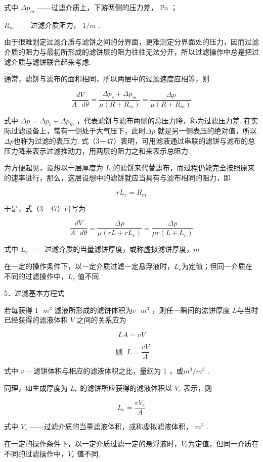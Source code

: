 \documentclass[
]{article}
\begin{document}
式中 \(\Delta p_{m}\) ------过滤介质上，下游两侧的压力差， Pa ；

\(R_{m}\) ------过滤介质阻力， \(1/m\) . 

由于很难划定过滤介质与滤饼之间的分界面，更难测定分界面处的压力，因而过滤介质的阻力与最初所形成的滤饼层的阻力往往无法分开，所以过滤操作中总是把过滤介质与滤饼联合起来考虑. 

通常，滤饼与滤布的面积相同，所以两层中的过滤速度应相等，则

\[\frac{dV}{A\text{\ }d\theta} = \frac{\Delta p_{c} + \Delta p_{m}}{\mu\left( R + R_{m} \right)} = \frac{\Delta p}{\mu\left( R + R_{m} \right)}\]

式中 \(\Delta p = \Delta p_{c} + \Delta p_{m}\)
，代表滤饼与滤布两侧的总压力降，称为过滤压力差. 在实际过滤设备上，常有一侧处于大气压下，此时\(\Delta p\) 就是另一侧表压的绝对值，所以 \(\Delta p\)也称为过滤的表压力. 式（3－47）表明，可用滤液通过串联的滤饼与滤布的总压力降来表示过滤推动力，用两层的阻力之和来表示总阻力. 

为方便起见，设想以一层厚度为 \(L_{e}\)的滤饼来代替滤布，而过程仍能完全按照原来的速率进行，那么，这层设想中的滤饼就应当具有与滤布相同的阻力，即

\[rL_{e} = R_{m}\]

于是，式（3－47）可写为

\[\frac{dV}{A\text{\ }d\theta} = \frac{\Delta p}{\mu\left( rL + rL_{e} \right)} = \frac{\Delta p}{\mu r\left( L + L_{e} \right)}\]

式中 \(L_{e}\) ------过滤介质的当量滤饼厚度，或称虚拟滤饼厚度，\(m_{\circ}\)

在一定的操作条件下，以一定介质过滤一定悬浮液时，\(L_{e}\)为定值；但同一介质在不同的过滤操作中，\(L_{e}\) 值不同. 

5．过滤基本方程式

若每获得 \(1{\text{\ }m}^{3}\) 滤液所形成的滤饼体积为\(v{\text{\ }m}^{3}\) ，则任一瞬间的汯饼厚度 \(L\)与当时已经获得的滤液体积 \(V\) 之间的关系应为

\[LA = vV\]

\[\text{~则~}\ L = \frac{vV}{A}\]

式中 \(v\) ---滤饼体积与相应的滤液体积之比，量纲为 1 ，或\(m^{3}/m^{3}\) . 

同理，如生成厚度为 \(L_{e}\) 的滤饼所应获得的滤液体积以 \(V_{e}\)
表示，则

\[L_{e} = \frac{vV_{e}}{A}\]

式中 \(V_{e}\) ------过滤介质的当量滤液体积，或称虚拟滤液体积，
\(m^{3}\) . 

在一定的操作条件下，以一定介质过滤一定的悬浮液时，\(V_{e}\)为定值，但同一介质在不同的过滤操作中，\(V_{e}\) 值不同. 
\end{document}
